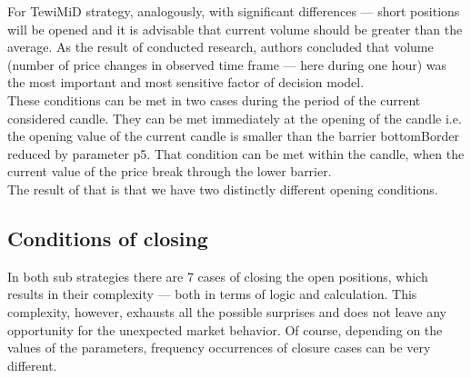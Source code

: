 \documentclass{tewiart}
\begin{document}
For TewiMiD strategy, analogously, with significant differences --- short positions will be opened and it is advisable that current volume should be greater  than the average. As the result of conducted research, authors concluded that volume (number of price changes in observed time frame --– here during one hour) was the most important and most sensitive factor of decision model.\\

These conditions can be met in two cases during the period of the current considered candle. They can be met immediately at the opening of the candle i.e. the opening value of the current candle is smaller than the barrier bottomBorder reduced by parameter p5. That condition can be met within the candle, when the current value of the price break through the lower barrier. \\
The result of that is that we have two distinctly different opening conditions.

\subsection{Conditions of closing}
In both sub strategies there are 7 cases of closing the open positions, which results in their complexity --- both in terms of logic and calculation. This complexity, however, exhausts all the possible surprises and does not  leave any opportunity for the unexpected market behavior. Of course, depending on the values of the parameters, frequency occurrences of closure cases can be very different.\\
\end{document}
